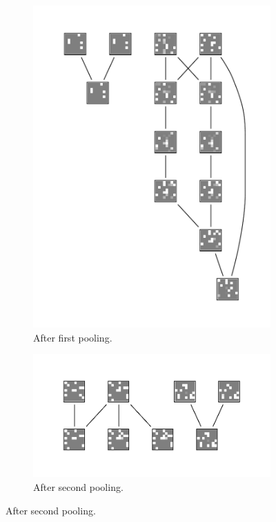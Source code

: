\documentclass{llncs}
\begin{document}
\begin{figure}
\begin{subfigure}{.3\textwidth}
		\includegraphics[width=\linewidth]{pool0}
		\caption{After first pooling.}
	\end{subfigure}
	\begin{subfigure}{.5\textwidth}
		\centering
		\includegraphics[width=\linewidth]{pool1}
		\caption{After second pooling.}
	\end{subfigure}

\end{figure}
\end{document}
